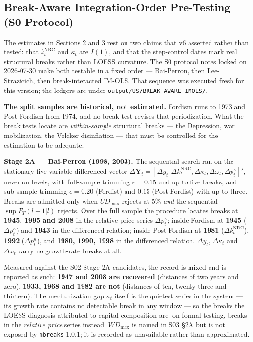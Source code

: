 \documentclass[11pt,a4paper]{article}
\begin{document}


\subsection{Break-Aware Integration-Order Pre-Testing (S0\* Protocol)}

The estimates in Sections 2 and 3 rest on two claims that v6 asserted rather than tested: that $k_t^{\text{NRC}}$ and $\kappa_t$ are $I(1)$, and that the step-control dates mark real structural breaks rather than LOESS curvature. The S0\* protocol notes locked on 2026-07-30 make both testable in a fixed order --- Bai-Perron, then Lee-Strazicich, then break-interacted IM-OLS. That sequence was executed fresh for this version; the ledgers are under \texttt{output/US/BREAK\_AWARE\_IMOLS/}.

\textbf{The split samples are historical, not estimated.} Fordism runs to 1973 and Post-Fordism from 1974, and no break test revises that periodization. What the break tests locate are \textit{within-sample} structural breaks --- the Depression, war mobilization, the Volcker disinflation --- that must be controlled for the estimation to be adequate.

\noindent\textbf{Stage 2A --- Bai-Perron (1998, 2003).} The sequential search ran on the stationary five-variable differenced vector $\Delta\mathbf{Y}_t = [\Delta y_t, \Delta k_t^{\text{NRC}}, \Delta\kappa_t, \Delta\omega_t, \Delta p_t^{\kappa}]'$, never on levels, with full-sample trimming $\epsilon = 0.15$ and up to five breaks, and sub-sample trimming $\epsilon = 0.20$ (Fordist) and $0.15$ (Post-Fordist) with up to three. Breaks are admitted only when $UD_{\max}$ rejects at 5\% \textit{and} the sequential $\sup F_T(l+1|l)$ rejects. Over the full sample the procedure locates breaks at \textbf{1945, 1995 and 2008} in the relative price series $\Delta p_t^{\kappa}$; inside Fordism at \textbf{1945} ($\Delta p_t^{\kappa}$) and \textbf{1943} in the differenced relation; inside Post-Fordism at \textbf{1981} ($\Delta k_t^{\text{NRC}}$), \textbf{1992} ($\Delta p_t^{\kappa}$), and \textbf{1980, 1990, 1998} in the differenced relation. $\Delta y_t$, $\Delta\kappa_t$ and $\Delta\omega_t$ carry no growth-rate breaks at all.

Measured against the S02 Stage 2A candidates, the record is mixed and is reported as such: \textbf{1947 and 2008 are recovered} (distances of two years and zero), \textbf{1933, 1968 and 1982 are not} (distances of ten, twenty-three and thirteen). The mechanization gap $\kappa_t$ itself is the quietest series in the system --- its growth rate contains no detectable break in any window --- so the breaks the LOESS diagnosis attributed to capital composition are, on formal testing, breaks in the \textit{relative price} series instead. $WD_{\max}$ is named in S03 \S2A but is not exposed by \texttt{mbreaks} 1.0.1; it is recorded as unavailable rather than approximated.
\end{document}
